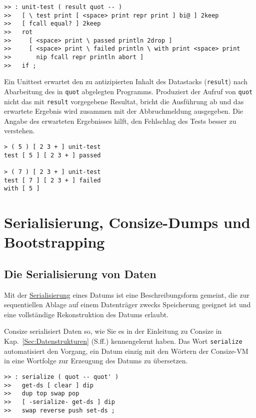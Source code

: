 \begin{verbatim}
>> : unit-test ( result quot -- )
>>   [ \ test print [ <space> print repr print ] bi@ ] 2keep 
>>   [ fcall equal? ] 2keep
>>   rot
>>     [ <space> print \ passed println 2drop ]
>>     [ <space> print \ failed println \ with print <space> print
>>       nip fcall repr println abort ]
>>   if ;
\end{verbatim}

Ein Unittest erwartet den zu antizipierten Inhalt des Datastacks (\verb|result|) nach Abarbeitung des in \verb|quot| abgelegten Programms. Produziert der Aufruf von \verb|quot| nicht das mit \verb|result| vorgegebene Resultat, bricht die Ausführung ab und das erwartete Ergebnis wird zusammen mit der Abbruchmeldung ausgegeben. Die Angabe des erwarteten Ergebnisses hilft, den Fehlschlag des Tests besser zu verstehen.

\begin{verbatim}
> ( 5 ) [ 2 3 + ] unit-test
test [ 5 ] [ 2 3 + ] passed

> ( 7 ) [ 2 3 + ] unit-test
test [ 7 ] [ 2 3 + ] failed
with [ 5 ]
\end{verbatim}

\section{Serialisierung, Consize-Dumps und Bootstrapping}

\subsection{Die Serialisierung von Daten}

Mit der \href{http://en.wikipedia.org/wiki/Serialization}{Serialisierung} eines Datums ist eine Beschreibungsform gemeint, die zur sequentiellen Ablage auf einem Datenträger zwecks Speicherung geeignet ist und eine vollständige Rekonstruktion des Datums erlaubt.

Consize serialisiert Daten so, wie Sie es in der Einleitung zu Consize in Kap.~\ref{Sec:Datenstrukturen} (S.\pageref{Sec:Datenstrukturen}ff.) kennengelernt haben. Das Wort \verb|serialize| automatisiert den Vorgang, ein Datum einzig mit den Wörtern der Consize-VM in eine Wortfolge zur Erzeugung des Datums zu übersetzen.

\begin{verbatim}
>> : serialize ( quot -- quot' )
>>   get-ds [ clear ] dip
>>   dup top swap pop     
>>   [ -serialize- get-ds ] dip
>>   swap reverse push set-ds ;
\end{verbatim}

